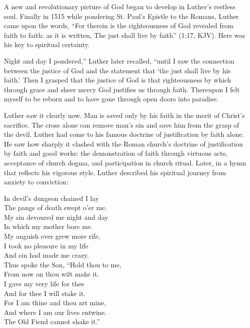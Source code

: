 A new and revolutionary picture of God began to develop in Luther’s restless soul. Finally in 1515
while pondering St. Paul’s Epistle to the Romans, Luther came upon the words, “For therein is the
righteousness of God revealed from faith to faith: as it is written, The just shall live by faith”
(1:17, KJV). Here was his key to spiritual certainty.

\begin{blockquote}
Night and day I pondered,” Luther later recalled, “until I saw the connection between the justice of
God and the statement that ‘the just shall live by his faith.’ Then I grasped that the justice of
God is that righteousness by which through grace and sheer mercy God justifies us through faith.
Thereupon I felt myself to be reborn and to have gone through open doors into paradise.
\end{blockquote}

Luther saw it clearly now. Man is saved only by his faith in the merit of Christ’s sacrifice. The
cross alone can remove man’s sin and save him from the grasp of the devil. Luther had come to his
famous doctrine of justification by faith alone. He saw how sharply it clashed with the Roman
church’s doctrine of justification by faith and good works: the demonstration of faith through
virtuous acts, acceptance of church dogma, and participation in church ritual. Later, in a hymn that
reflects his vigorous style, Luther described his spiritual journey from anxiety to conviction:

\begin{poem}
In devil’s dungeon chained I lay\\
The pangs of death swept o’er me.\\
My sin devoured me night and day\\
In which my mother bore me.\\
My anguish ever grew more rife,\\
I took no pleasure in my life\\
And sin had made me crazy.\\
Thus spoke the Son, “Hold thou to me,\\
From now on thou wilt make it.\\
I gave my very life for thee\\
And for thee I will stake it.\\
For I am thine and thou art mine,\\
And where I am our lives entwine.\\
The Old Fiend cannot shake it.”
\end{poem}


